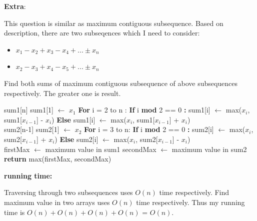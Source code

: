 \documentclass[12pt]{article}
\begin{document}
\pagebreak
\large \textbf{Extra}:\\ \vspace{5mm}\par
\normalsize 
\setlength{\baselineskip}{8mm}

This question is similar as maximum contiguous subsequence. 
Based on description, there are two subseqences which I need to consider:
\begin{itemize}
  \item $x_1 - x_2 + x_3 - x_4 + ... \pm x_n$
  \item $x_2 - x_3 + x_4 - x_5 + ... \pm x_n$
\end{itemize}
Find both sums of maximum contiguous subsequence of above subsequences respectively. The greater one is result.


\begin{algorithm}
\begin{algorithmic}
\State sum1[n]
\State sum1[1] $\leftarrow$ $x_1$
\State \textbf{For} i = 2 to n :
\State \hspace{0.4cm} \textbf{If} i \textbf{mod} 2 == 0 \textbf{:}
\State \hspace{0.8cm} sum1[i] $\leftarrow$ max($x_i$, sum1[$x_{i-1}$] - $x_i$) 
\State \hspace{0.4cm} \textbf{Else}
\State \hspace{0.8cm} sum1[i] $\leftarrow$ max($x_i$, sum1[$x_{i-1}$] + $x_i$)
\\
\State sum2[n-1]
\State sum2[1] $\leftarrow$ $x_2$
\State \textbf{For} i = 3 to n:
\State \hspace{0.4cm} \textbf{If} i \textbf{mod} 2 == 0 \textbf{:}
\State \hspace{0.8cm} sum2[i] $\leftarrow$ max($x_i$, sum2[$x_{i-1}$] + $x_i$) 
\State \hspace{0.4cm} \textbf{Else}
\State \hspace{0.8cm} sum2[i] $\leftarrow$ max($x_i$, sum2[$x_{i-1}$] - $x_i$)
\\
\State firstMax $\leftarrow$ maximum value in sum1
\State secondMax $\leftarrow$ maximum value in sum2
\State \textbf{return} max(firstMax, secondMax)
\end{algorithmic}
\end{algorithm}


\textbf{running time:} \par
Traversing through two subsequences uses $O(n)$ time respectively. Find maximum value in two arrays uses $O(n)$ time respectively. 
Thus my running time is $O(n) + O(n) + O(n) + O(n)$ = $O(n)$.
\end{document}
